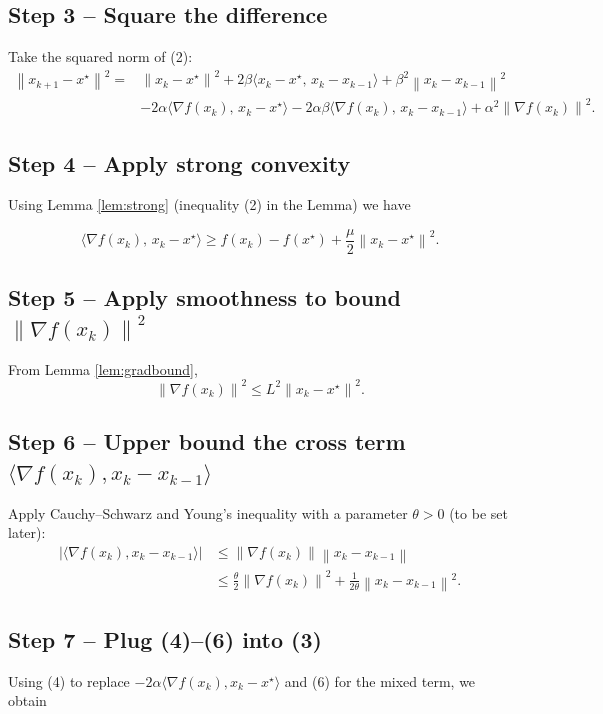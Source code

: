 \documentclass{article}
\newcommand{\norm}[1]{\left\|#1\right\|}
\begin{document}
\subsection*{Step 3 – Square the difference}
Take the squared norm of (2):
\[
\begin{aligned}
\norm{x_{k+1}-x^\star}^{2}
=&\norm{x_k-x^\star}^{2}
+2\beta\langle x_k-x^\star,\,x_k-x_{k-1}\rangle
+\beta^{2}\norm{x_k-x_{k-1}}^{2}\\
&-2\alpha\langle\nabla f(x_k),\,x_k-x^\star\rangle
-2\alpha\beta\langle\nabla f(x_k),\,x_k-x_{k-1}\rangle
+\alpha^{2}\norm{\nabla f(x_k)}^{2}.
\end{aligned}
\tag{3}
\]

\subsection*{Step 4 – Apply strong convexity}
Using Lemma \ref{lem:strong} (inequality (2) in the Lemma) we have  

\[
\langle\nabla f(x_k),\,x_k-x^\star\rangle\ge f(x_k)-f(x^\star)+\frac{\mu}{2}\norm{x_k-x^\star}^{2}.
\tag{4}
\]

\subsection*{Step 5 – Apply smoothness to bound $\norm{\nabla f(x_k)}^{2}$}
From Lemma \ref{lem:gradbound},
\[
\norm{\nabla f(x_k)}^{2}\le L^{2}\norm{x_k-x^\star}^{2}.
\tag{5}
\]

\subsection*{Step 6 – Upper bound the cross term $\langle\nabla f(x_k),x_k-x_{k-1}\rangle$}
Apply Cauchy–Schwarz and Young’s inequality with a parameter $\theta>0$ (to be set later):
\[
\begin{aligned}
|\langle\nabla f(x_k),x_k-x_{k-1}\rangle|
&\le \norm{\nabla f(x_k)}\norm{x_k-x_{k-1}}\\
&\le \frac{\theta}{2}\norm{\nabla f(x_k)}^{2}
      +\frac{1}{2\theta}\norm{x_k-x_{k-1}}^{2}.
\end{aligned}
\tag{6}
\]

\subsection*{Step 7 – Plug (4)–(6) into (3)}
Using (4) to replace $-2\alpha\langle\nabla f(x_k),x_k-x^\star\rangle$ and (6) for the mixed term, we obtain
\end{document}
